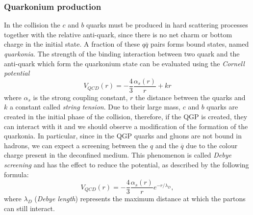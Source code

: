 \documentclass[b5paper,10pt,twoside,oldstyle,classica]{toptesi}
\begin{document}
\subsubsection{Quarkonium production}
In the collision the $c$ and $b$ quarks must be produced in hard scattering processes together with the relative anti-quark, since there is no net charm or bottom charge in the initial state. A fraction of these $q\bar{q}$ pairs forms bound states, named \textit{quarkonia}. The strength of the binding interaction between two quark and the anti-quark which form the quarkonium state can be evaluated using the \textit{Cornell potential} 
\begin{equation}
 V_{QCD} (r) = -\frac{4}{3}\frac{\alpha_s(r)}{r}+kr
\end{equation}
where $\alpha_s$ is the strong coupling constant, $r$ the distance between the quarks and $k$ a constant called \textit{string tension}.
Due to their large mass, $c$ and $b$ quarks are created in the initial phase of the collision, therefore, if the QGP is created, they can interact with it and we should observe a modification of the formation of the quarkonia. In particular, since in the QGP quarks and gluons are not bound in hadrons, we can expect a screening between the $q$ and the $\overline{q}$ due to the colour charge present in the deconfined medium. This phenomenon is called \textit{Debye screening} and has the effect to reduce the potential, as described by the following formula:
\begin{equation}
 V_{QCD} (r) = -\frac{4}{3}\frac{\alpha_s(r)}{r}e^{-r/\lambda_D},
\end{equation}
where $\lambda_D$ (\textit{Debye length}) represents the maximum distance at which the partons can still interact.
\end{document}
